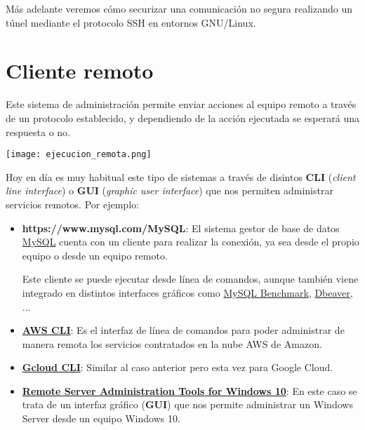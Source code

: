 
Más adelante veremos cómo securizar una comunicación no segura realizando un túnel mediante el protocolo SSH en entornos GNU/Linux.


\section{Cliente remoto}

Este sistema de administración permite enviar acciones al equipo remoto a través de un protocolo establecido, y  dependiendo de la acción ejecutada se esperará una respuesta o no.

\begin{center}
    \texttt{[image: ejecucion\_remota.png]}
\end{center}

Hoy en día es muy habitual este tipo de sistemas a través de disintos \textbf{CLI} (\textit{client line interface})  o \textbf{GUI} (\textit{graphic user interface}) que nos permiten administrar servicios remotos. Por ejemplo:

\begin{itemize}
    \item \textbf{{https://www.mysql.com/}{MySQL}}: El sistema gestor de base de datos \href{https://www.mysql.com/}{MySQL} cuenta con un cliente para realizar la  conexión, ya sea desde el propio equipo o desde un equipo remoto.

    Este cliente se puede ejecutar desde línea de comandos, aunque también viene integrado en distintos interfaces gráficos como \href{https://dev.mysql.com/downloads/benchmarks.html}{MySQL Benchmark}, \href{https://dbeaver.io/}{Dbeaver}, ...

    \item \textbf{\href{https://aws.amazon.com/es/cli/}{AWS CLI}}: Es el interfaz de línea de comandos para poder administrar de manera remota los servicios contratados en la nube AWS de Amazon.

    \item \textbf{\href{https://cloud.google.com/cli}{Gcloud CLI}}: Similar al caso anterior pero esta vez para Google Cloud.

    \item \textbf{\href{https://www.microsoft.com/en-us/download/details.aspx?id=45520}{Remote Server Administration Tools for Windows 10}}: En este caso se trata de un interfaz gráfico (\textbf{GUI}) que nos permite administrar un Windows Server desde un equipo Windows 10.
\end{itemize}


